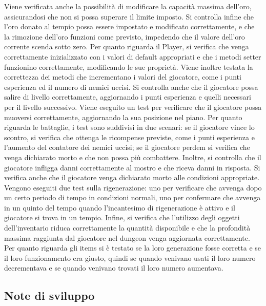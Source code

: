 \documentclass{report}
\begin{document}
%
Viene verificata anche la possibilità di modificare la capacità massima dell’oro, assicurandosi che non si possa superare il limite imposto. Si controlla infine che l’oro donato al tempio possa essere impostato e modificato correttamente,
%
e che la rimozione dell’oro funzioni come previsto, impedendo che il valore dell’oro corrente scenda sotto zero. \newline
%
Per quanto riguarda il Player, si verifica che venga correttamente inizializzato con i valori di default appropriati e che i metodi setter funzionino correttamente, modificando le sue proprietà.
%
Viene inoltre testata la correttezza dei metodi che incrementano i valori del giocatore, come i punti esperienza ed il numero di nemici uccisi. Si controlla anche che il giocatore possa salire di livello correttamente, 
%
aggiornando i punti esperienza e quelli necessari per il livello successivo. Viene eseguito un test per verificare che il giocatore possa muoversi correttamente, aggiornando la sua posizione nel piano. \newline
%
Per quanto riguarda le battaglie, i test sono suddivisi in due scenari: se il giocatore vince lo scontro, si verifica che ottenga le ricompense previste, come i punti esperienza e l’aumento del contatore dei nemici uccisi;
%
se il giocatore perdem si verifica che venga dichiarato morto e che non possa più combattere. Inoltre, si controlla che il giocatore infligga danni correttamente al mostro e che riceva danni in risposta. Si verifica anche 
%
che il giocatore venga dichiarato morto alle condizioni appropriate. \newline
%
Vengono eseguiti due test sulla rigenerazione: uno per verificare che avvenga dopo un certo periodo di tempo in condizioni normali, uno per confermare che avvenga in un quinto del tempo quando l’incantesimo di rigenerazione 
%
è attivo e il giocatore si trova in un tempio. \newline
%
Infine, si verifica che l’utilizzo degli oggetti dell’inventario riduca correttamente la quantità disponibile e che la profondità massima raggiunta dal giocatore nel dungeon venga aggiornata correttamente. \newline
%
Per quanto riguarda gli items si è testato se la loro generazione fosse corretta e se il loro funzionamento era giusto, quindi se quando venivano usati il loro numero decrementava e se quando venivano trovati il loro numero aumentava. \newline
%

\subsection{Note di sviluppo}
\end{document}
